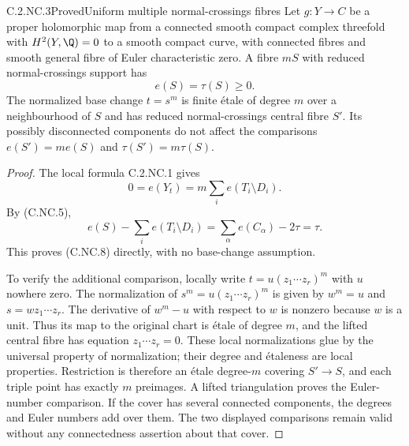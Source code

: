 \begin{statement}{C.2.NC.3}{Proved}{Uniform multiple normal-crossings fibres}
Let $g:Y\to C$ be a proper holomorphic map from a connected smooth compact complex threefold with $H^2(Y,\Q)=0$ to a smooth compact curve, with connected fibres and smooth general fibre of Euler characteristic zero. A fibre $mS$ with reduced normal-crossings support has
\[
 e(S)=\tau(S)\ge0.
 \tag{C.NC.8}
\]
The normalized base change $t=s^m$ is finite étale of degree $m$ over a neighbourhood of $S$ and has reduced normal-crossings central fibre $S'$. Its possibly disconnected components do not affect the comparisons
$e(S')=m e(S)$ and $\tau(S')=m\tau(S)$.
\end{statement}
\begin{proof}
The local formula C.2.NC.1 gives
\[
 0=e(Y_t)=m\sum_i e(T_i\setminus D_i).
\]
By (C.NC.5),
\[
 e(S)-\sum_i e(T_i\setminus D_i)
 =\sum_\alpha e(C_\alpha)-2\tau=\tau.
\]
This proves (C.NC.8) directly, with no base-change assumption.

To verify the additional comparison, locally write $t=u(z_1\cdots z_r)^m$ with $u$ nowhere zero. The normalization of $s^m=u(z_1\cdots z_r)^m$ is given by
$w^m=u$ and $s=wz_1\cdots z_r$.
The derivative of $w^m-u$ with respect to $w$ is nonzero because $w$ is a unit. Thus its map to the original chart is étale of degree $m$, and the lifted central fibre has equation $z_1\cdots z_r=0$. These local normalizations glue by the universal property of normalization; their degree and étaleness are local properties. Restriction is therefore an étale degree-$m$ covering $S'\to S$, and each triple point has exactly $m$ preimages. A lifted triangulation proves the Euler-number comparison. If the cover has several connected components, the degrees and Euler numbers add over them. The two displayed comparisons remain valid without any connectedness assertion about that cover.
\end{proof}

